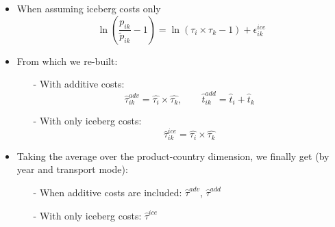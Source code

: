 \documentclass[10 pt,Helvetica, french]{beamer}
\begin{document}
\begin{frame}
\begin{itemize}
\item When assuming iceberg costs only
\begin{equation}
\ln\left(\frac{p_{ik}}{\widetilde{p}_{ik}}-1 \right)= \ln \left(\tau_{i} \times \tau_{k}-1 \right) + \epsilon^{ice}_{ik} \label{eq:model_nlI}
\end{equation}

\item From which we re-built: \vspace{0.1cm}
\begin{itemize}
\item[-] With additive costs:
$$\widehat{\tau}^{adv}_{ik} = \widehat{\tau_{i}} \times \widehat{\tau_{k}}, \qquad \widehat{t}^{add}_{ik} = \widehat{t}_{i} + \widehat{t}_{k}$$
\item[-] With only iceberg costs:
$$\widehat{\tau}^{ice}_{ik} = \widehat{\tau_{i}} \times \widehat{\tau_{k}}$$
\end{itemize}
\item  Taking the average over the product-country dimension, we finally get (by year and transport mode): \vspace{0.1cm}
\begin{itemize}
\item[-] When additive costs are included: $\widehat{\tau}^{adv}$, $\widehat{\tau}^{add}$  \vspace{0.1cm}
\item[-] With only iceberg costs: $\widehat{\tau}^{ice}$
\end{itemize}
\end{itemize}
\end{frame}
\end{document}
